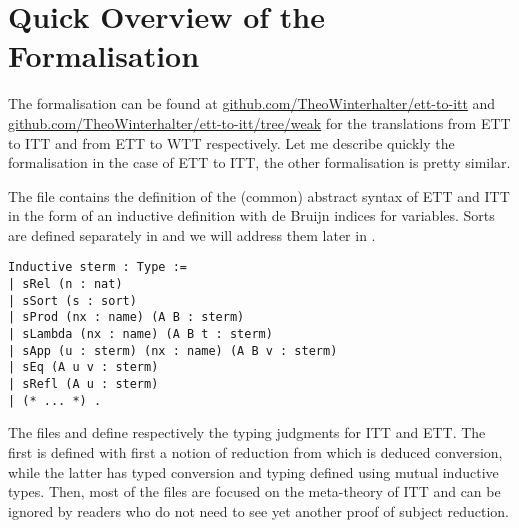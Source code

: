 \section{Quick Overview of the Formalisation}

The formalisation can be found at
\href{https://github.com/TheoWinterhalter/ett-to-itt}{github.com/TheoWinterhalter/ett-to-itt}
and
\href{https://github.com/TheoWinterhalter/ett-to-itt/tree/weak}{github.com/TheoWinterhalter/ett-to-itt/tree/weak}
for the translations from \acrshort{ETT} to \acrshort{ITT} and from
\acrshort{ETT} to \acrshort{WTT} respectively.
Let me describe quickly the formalisation in the case of \acrshort{ETT} to
\acrshort{ITT}, the other formalisation is pretty similar.

The file  contains the definition of the (common) abstract syntax
of \acrshort{ETT} and \acrshort{ITT} in the form of an inductive definition with
de Bruijn indices for variables.
Sorts are defined separately in  and we will address them later
in .

\begin{verbatim}
Inductive sterm : Type :=
| sRel (n : nat)
| sSort (s : sort)
| sProd (nx : name) (A B : sterm)
| sLambda (nx : name) (A B t : sterm)
| sApp (u : sterm) (nx : name) (A B v : sterm)
| sEq (A u v : sterm)
| sRefl (A u : sterm)
| (* ... *) .
\end{verbatim}

The files  and  define respectively the
typing judgments for \acrshort{ITT} and \acrshort{ETT}.
The first is defined with first a notion of reduction from which is deduced
conversion, while the latter has typed conversion and typing defined using
mutual inductive types.
Then, most of the files are focused on the meta-theory of \acrshort{ITT} and can
be ignored by readers who do not need to see yet another proof of subject
reduction.

